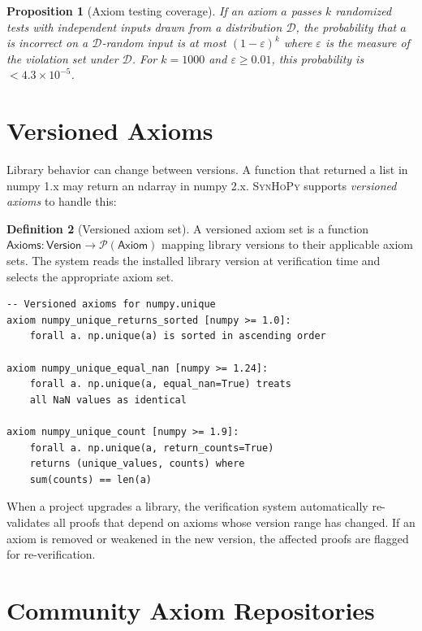 \documentclass[11pt,a4paper]{report}
\theoremstyle{definition}
\newtheorem{definition}{Definition}[chapter]
\theoremstyle{plain}
\newtheorem{proposition}[definition]{Proposition}
\newcommand{\synhopy}{\textsc{SynHoPy}}
\begin{document}
\begin{proposition}[Axiom testing coverage]
If an axiom $a$ passes $k$ randomized tests with independent inputs drawn
from a distribution $\mathcal{D}$, the probability that $a$ is incorrect on
a $\mathcal{D}$-random input is at most $(1 - \varepsilon)^k$ where
$\varepsilon$ is the measure of the violation set under $\mathcal{D}$.
For $k = 1000$ and $\varepsilon \geq 0.01$, this probability is
$< 4.3 \times 10^{-5}$.
\end{proposition}

\section{Versioned Axioms}

Library behavior can change between versions.  A function that returned a
list in numpy 1.x may return an ndarray in numpy 2.x.  \synhopy{} supports
\emph{versioned axioms} to handle this:

\begin{definition}[Versioned axiom set]
A versioned axiom set is a function $\mathsf{Axioms}: \mathsf{Version} \to
\mathcal{P}(\mathsf{Axiom})$ mapping library versions to their applicable
axiom sets.  The system reads the installed library version at verification
time and selects the appropriate axiom set.
\end{definition}

\begin{lstlisting}[style=proof]
-- Versioned axioms for numpy.unique
axiom numpy_unique_returns_sorted [numpy >= 1.0]:
    forall a. np.unique(a) is sorted in ascending order

axiom numpy_unique_equal_nan [numpy >= 1.24]:
    forall a. np.unique(a, equal_nan=True) treats
    all NaN values as identical

axiom numpy_unique_count [numpy >= 1.9]:
    forall a. np.unique(a, return_counts=True)
    returns (unique_values, counts) where
    sum(counts) == len(a)
\end{lstlisting}

When a project upgrades a library, the verification system automatically
re-validates all proofs that depend on axioms whose version range has
changed.  If an axiom is removed or weakened in the new version, the
affected proofs are flagged for re-verification.

\section{Community Axiom Repositories}
\end{document}
